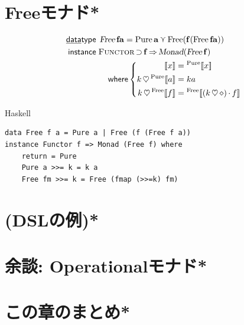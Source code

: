 \documentclass[a5paper,twoside,fleqn,draft]{jsbook}
\def\[{[\![}
\def\]{]\!]}
\newcommand{\programminglanguage}[1]{\textsf{#1}}
\newcommand{\haskell}{\programminglanguage{Haskell}}
\newenvironment{haskellcode}{\begin{itembox}[r]{\haskell}}{\end{itembox}}
\newcommand{\mKeyword}[1]{\mathsf{#1}}
\newcommand{\mKeywordUnderline}[1]{\text{\underline{\textsf{#1}}}}
\newcommand{\mDataTypeKeyword}{\mKeywordUnderline{data}\mKeyword{type}}
\newcommand{\mInstanceDeclKeyword}{\mKeyword{instance}}
\newcommand{\mWhereKeyword}{\mKeyword{where}}
\DeclareMathOperator{\mDataType}{\mDataTypeKeyword}
\DeclareMathOperator{\mInstanceDecl}{\mInstanceDeclKeyword}
\DeclareMathOperator{\mSuperClass}{\Rightarrow}
\DeclareMathOperator{\mSuperSet}{\supset}
\DeclareMathOperator{\mWhere}{\mWhereKeyword}
\newcommand{\mAnonParam}{\diamond}
\DeclareMathOperator{\mBind}{\heartsuit}
\DeclareMathOperator{\mMap}{\cdot}
\DeclareMathOperator{\mValueOr}{\curlyvee}
\newcommand{\mType}[1]{\mathbf{#1}} %
\newcommand{\mA}{\mType{a}}
\newcommand{\mTypeConstructor}[1]{\textsl{#1}}
\newcommand{\mValueConstructor}[1]{\mathrm{#1}}
\newcommand{\mValueWith}[2]{{}^\mValueConstructor{#1}\[#2\]}
\newcommand{\mPureWith}[1]{\[#1\]}
\newcommand{\mTypeClass}[1]{\textsc{#1}} %
\newcommand{\mFunctorTypeClass}{\mTypeClass{Functor}}
\begin{document}
\section{Freeモナド*}
\begin{align}
\mDataType\;&\mathop{\mTypeConstructor{Free}}\mType{f}\mA =\mathop{\mValueConstructor{Pure}}\mA \mValueOr\mathop{\mValueConstructor{Free}(\mType{f}(\mathop{\mValueConstructor{Free}}\mType{f}\mA ))}\\
\mInstanceDecl\;&\mFunctorTypeClass\mSuperSet\mType{f}\mSuperClass\mTypeConstructor{Monad}(\mathop{\mTypeConstructor{Free}}\mType{f})\nonumber\\
&\quad\mWhere\left\{
\begin{aligned}
\mPureWith{x}&=\mValueWith{Pure}{x}\\
k\mBind\mValueWith{Pure}{a}&=ka\\
k\mBind\mValueWith{Free}{f}&=\mValueWith{Free}{(k\mBind\mAnonParam)\mMap f}
\end{aligned}
\right.
\end{align}

\begin{haskellcode}
\begin{verbatim}
data Free f a = Pure a | Free (f (Free f a))
instance Functor f => Monad (Free f) where
    return = Pure
    Pure a >>= k = k a
    Free fm >>= k = Free (fmap (>>=k) fm)
\end{verbatim}
\end{haskellcode}

\section{(DSLの例)*}
\section{余談: Operationalモナド*}
\section{この章のまとめ*}


\end{document}
